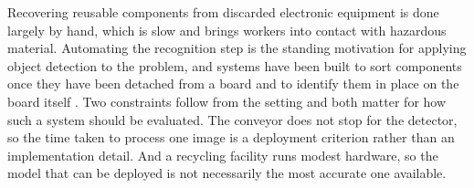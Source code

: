 %
%

Recovering reusable components from discarded electronic equipment is done
largely by hand, which is slow and brings workers into contact with hazardous
material. Automating the recognition step is the standing motivation for
applying object detection to the problem, and systems have been built to sort
components once they have been detached from a board \citep{lu2022sorting} and
to identify them in place on the board itself \citep{sharma2024vision}. Two
constraints follow from the setting and both matter for how such a system should
be evaluated. The conveyor does not stop for the detector, so the time taken to
process one image is a deployment criterion rather than an implementation
detail. And a recycling facility runs modest hardware, so the model that can be
deployed is not necessarily the most accurate one available.

